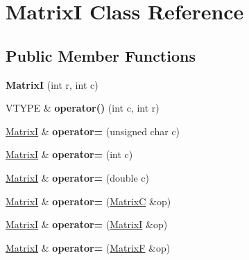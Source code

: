 \hypertarget{class_matrix_i}{\section{Matrix\+I Class Reference}
\label{class_matrix_i}
}
\subsection*{Public Member Functions}
\begin{DoxyCompactItemize}
\item 
\hypertarget{class_matrix_i_ae949c13e53071c267ca35e92e11ac032}{{\bfseries Matrix\+I} (int r, int c)}\label{class_matrix_i_ae949c13e53071c267ca35e92e11ac032}

\item 
\hypertarget{class_matrix_i_a59af76927c0727030100b8b360842773}{V\+T\+Y\+P\+E \& {\bfseries operator()} (int c, int r)}\label{class_matrix_i_a59af76927c0727030100b8b360842773}

\item 
\hypertarget{class_matrix_i_aa5a2b39aa48df812f45c67138f444363}{\hyperlink{class_matrix_i}{Matrix\+I} \& {\bfseries operator=} (unsigned char c)}\label{class_matrix_i_aa5a2b39aa48df812f45c67138f444363}

\item 
\hypertarget{class_matrix_i_a9be0047b4c45707ce88a1d5e36f4a3f6}{\hyperlink{class_matrix_i}{Matrix\+I} \& {\bfseries operator=} (int c)}\label{class_matrix_i_a9be0047b4c45707ce88a1d5e36f4a3f6}

\item 
\hypertarget{class_matrix_i_ac4fc5f4db18c7133981c0e4be7e472be}{\hyperlink{class_matrix_i}{Matrix\+I} \& {\bfseries operator=} (double c)}\label{class_matrix_i_ac4fc5f4db18c7133981c0e4be7e472be}

\item 
\hypertarget{class_matrix_i_af960611b497cf5c3d737d191d7ef11ae}{\hyperlink{class_matrix_i}{Matrix\+I} \& {\bfseries operator=} (\hyperlink{class_matrix_c}{Matrix\+C} \&op)}\label{class_matrix_i_af960611b497cf5c3d737d191d7ef11ae}

\item 
\hypertarget{class_matrix_i_ac2f26e6e05ab13dc468b182f6e2e897a}{\hyperlink{class_matrix_i}{Matrix\+I} \& {\bfseries operator=} (\hyperlink{class_matrix_i}{Matrix\+I} \&op)}\label{class_matrix_i_ac2f26e6e05ab13dc468b182f6e2e897a}

\item 
\hypertarget{class_matrix_i_a6eb133ad01e765e91d225ec1b2793695}{\hyperlink{class_matrix_i}{Matrix\+I} \& {\bfseries operator=} (\hyperlink{class_matrix_f}{Matrix\+F} \&op)}\label{class_matrix_i_a6eb133ad01e765e91d225ec1b2793695}


\end{DoxyCompactItemize}
